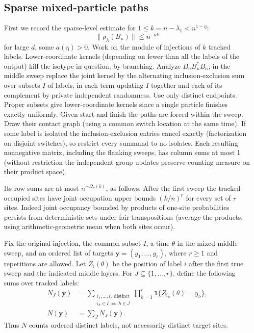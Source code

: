 \subsection{Sparse mixed-particle paths}
First we record the sparse-level estimate for \(1\le k=n-\lambda_1<n^{1-\eta}\):
\begin{equation}
 \|\rho_\lambda(B_n)\|\le n^{-a k}
 \label{ten:compressed:eq:2}
\end{equation}
for large \(d\), some \(a(\eta)>0\). Work on the module of injections of \(k\) tracked labels. Lower-coordinate kernels (depending on fewer than all the labels of the output) kill the isotype in question, by branching. Analyze \(B_n B_n^* B_n\); in the middle sweep replace the joint kernel by the alternating inclusion-exclusion sum over subsets \(I\) of labels, in each term updating \(I\) together and each of its complement by private independent randomness. Use only distinct endpoints. Proper subsets give lower-coordinate kernels since a single particle finishes exactly uniformly. Given start and finish the paths are forced within the sweep. Draw their contact graph (using a common switch location at the same time). If some label is isolated the inclusion-exclusion entries cancel exactly (factorization on disjoint switches), so restrict every summand to no isolates. Each resulting nonnegative matrix, including the flanking sweeps, has column sums at most 1 (without restriction the independent-group updates preserve counting measure on their product space).

Its row sums are at most \(n^{-\Omega_\eta(k)}\), as follows. After the first sweep the tracked occupied sites have joint occupation upper bounds \((k/n)^r\) for every set of \(r\) sites. Indeed joint occupancy bounded by products of one-site probabilities persists from deterministic sets under fair transpositions (average the products, using arithmetic-geometric mean when both sites occur).

Fix the original injection, the common subset \(I\), a time \(\theta\) in the mixed middle sweep, and an ordered list of targets
\(\mathbf y=(y_1,\ldots,y_r)\), where \(r\ge1\) and repetitions are allowed.
Let \(Z_i(\theta)\) be the position of label \(i\) after the first true sweep and the indicated middle layers. For
\(J\subseteq\{1,\ldots,r\}\), define the following sums over tracked labels:
\[
 \begin{aligned}
 N_J(\mathbf y)&=
 \sum_{\substack{i_1,\ldots,i_r\text{ distinct}\\
                  i_h\in I\ \Longleftrightarrow\ h\in J}}
       \prod_{h=1}^r \mathbf1\{Z_{i_h}(\theta)=y_h\},\\
 N(\mathbf y)&=\sum_JN_J(\mathbf y).
 \end{aligned}
\]
Thus \(N\) counts ordered distinct labels, not necessarily distinct target sites.

